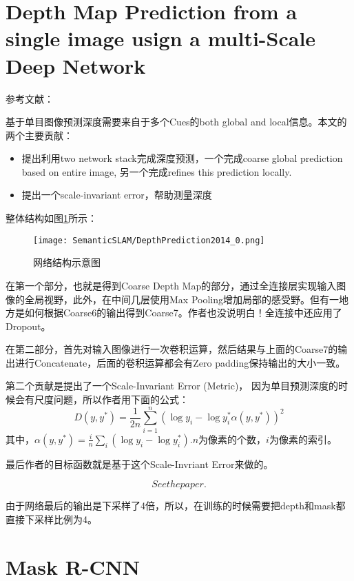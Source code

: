 \section{Depth Map Prediction from a single image usign a multi-Scale Deep Network}

参考文献：

基于单目图像预测深度需要来自于多个Cues的both global and local信息。本文的两个主要贡献：
\begin{itemize}
\item 提出利用two network stack完成深度预测，一个完成coarse global prediction based on entire image, 另一个完成refines this prediction locally.
\item 提出一个scale-invariant error，帮助测量深度
\end{itemize}

整体结构如图\ref{DepthPrediction2014_0}所示：
\begin{figure}[!hbtp]
\centering
\texttt{[image: SemanticSLAM/DepthPrediction2014\_0.png]}
\caption{网络结构示意图}
\label{DepthPrediction2014_0}
\end{figure}

在第一个部分，也就是得到Coarse Depth Map的部分，通过全连接层实现输入图像的全局视野，此外，在中间几层使用Max Pooling增加局部的感受野。但有一地方是如何根据Coarse6的输出得到Coarse7。作者也没说明白！全连接中还应用了Dropout。

在第二部分，首先对输入图像进行一次卷积运算，然后结果与上面的Coarse7的输出进行Concatenate，后面的卷积运算都会有Zero padding保持输出的大小一致。

第二个贡献是提出了一个Scale-Invariant Error (Metric)， 因为单目预测深度的时候会有尺度问题，所以作者用下面的公式：
\begin{displaymath}
D(y, y^{*})  = \frac{1}{2n}\sum_{i=1}^{n} \left( \log y_i - \log y^{*}_i  \alpha(y, y^{*}) \right)^2
\end{displaymath}
其中，$ \alpha(y, y^{*})= \frac{i}{n}\sum_{i}(\log y_i - \log y^{*}_i)$.$n$为像素的个数，$i$为像素的索引。

最后作者的目标函数就是基于这个Scale-Invriant Error来做的。

\begin{displaymath}
See the paper.
\end{displaymath}

由于网络最后的输出是下采样了4倍，所以，在训练的时候需要把depth和mask都直接下采样比例为4。

\section{Mask R-CNN}

